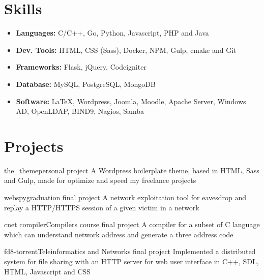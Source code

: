 \documentclass{cv}
\begin{document}
  \section{Skills}
  \begin{itemize}
    \item[] \textbf{Languages:} C/C++, Go, Python, Javascript, PHP and Java
    \item[] \textbf{Dev. Tools:} HTML, CSS (Sass), Docker, NPM, Gulp, cmake and Git
    \item[] \textbf{Frameworks:} Flask, jQuery, Codeigniter
    \item[] \textbf{Database:} MySQL, PostgreSQL, MongoDB
    \item[] \textbf{Software:} \LaTeX, Wordpress, Joomla, Moodle, Apache Server, Windows AD, OpenLDAP, BIND9, Nagios, Samba
  \end{itemize}

  \section{Projects}
  \begin{chronoitem}{the\_theme}{personal project}{}
    A Wordpress boilerplate theme, based in HTML, Sass and Gulp, made for optimize and speed my freelance projects
  \end{chronoitem}

  \begin{chronoitem}{webspy}{graduation final project}{}
    A network exploitation tool for eavesdrop and replay a HTTP/HTTPS session of a given victim in a network
  \end{chronoitem}

  \begin{chronoitem}{cnet compiler}{Compilers course final project}{}
    A compiler for a subset of C language which can understand network address and generate a three address code
  \end{chronoitem}

  \begin{chronoitem}{fd8-torrent}{Teleinformatics and Networks final project}{}
    Implemented a distributed system for file sharing with an HTTP server for web user interface in C++, SDL, HTML, Javascript and CSS
  \end{chronoitem}
\end{document}
